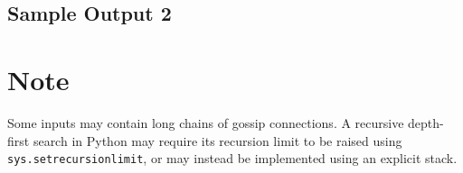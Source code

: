 \documentclass{article}
\newcommand{\sampleboxwidth}{\dimexpr\textwidth-2\fboxsep-2\fboxrule\relax}
\begin{document}
\subsection*{Sample Output 2}
\fbox{
  \begin{minipage}{\sampleboxwidth}
    \ttfamily
    2
  \end{minipage}%
}

\section*{Note}
Some inputs may contain long chains of gossip connections. A recursive depth-first search in Python may require its recursion limit to be raised using \texttt{sys.setrecursionlimit}, or may instead be implemented using an explicit stack.
\end{document}
